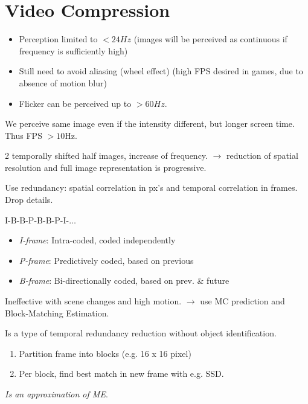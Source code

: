 \section{Video Compression}

\begin{itemize}
    \item Perception limited to $<24Hz$ (images will be perceived as continuous if frequency is sufficiently high)
    \item Still need to avoid aliasing (wheel effect) (high FPS desired in games, due to absence of motion blur)
    \item Flicker can be perceived up to $>60Hz$.
\end{itemize}

\begin{definition}
  We perceive same image even if the intensity different, but longer screen time. Thus FPS \(> 10 \text{Hz}\).
\end{definition}

\begin{definition}
  2 temporally shifted half images, increase of frequency. \(\to\) reduction of spatial resolution and full image representation is progressive.
\end{definition}

\begin{definition}
  Use redundancy: spatial correlation in px's and temporal correlation in frames. Drop details.
\end{definition}

\begin{algorithm}
  I-B-B-P-B-B-P-I-\(\ldots\)
  \begin{itemize}
    \item \textit{I-frame}: Intra-coded, coded independently
    \item \textit{P-frame}: Predictively coded, based on previous
    \item \textit{B-frame}: Bi-directionally coded, based on prev. \& future
  \end{itemize}
\end{algorithm}

\begin{theorem}
  Ineffective with scene changes and high motion. \(\to\) use MC prediction and Block-Matching Estimation.
\end{theorem}

\begin{algorithm}
  Is a type of temporal redundancy reduction without object identification.

  \begin{enumerate}
    \item Partition frame into blocks (e.g. 16 x 16 pixel)
    \item Per block, find best match in new frame with e.g. SSD.
  \end{enumerate}

  \textit{Is an approximation of ME}.
\end{algorithm}

